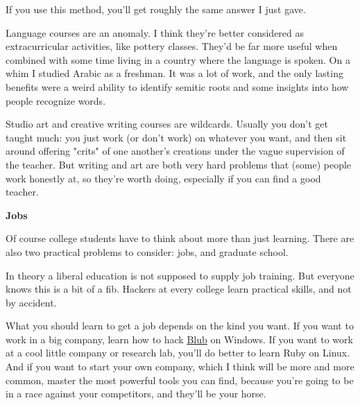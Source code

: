 If you use this method, you'll get
                    roughly the same answer I just gave.

Language
                    courses are an anomaly. I think they're better considered as
                    extracurricular activities, like pottery classes. They'd be
                    far more useful when combined with some time living in a
                    country where the language is spoken. On a whim I studied
                    Arabic as a freshman. It was a lot of work, and the only
                    lasting benefits were a weird ability to identify semitic
                    roots and some insights into how people recognize words.

Studio
                    art and creative writing courses are wildcards. Usually you
                    don't get taught much: you just work (or don't work) on
                    whatever you want, and then sit around offering "crits" of
                    one another's creations under the vague supervision of the
                    teacher. But writing and art are both very hard problems
                    that (some) people work honestly at, so they're worth doing,
                    especially if you can find a good teacher.

\textbf{Jobs}

Of course college students have to think about
                    more than just learning. There are also two practical
                    problems to consider: jobs, and graduate school.

In
                    theory a liberal education is not supposed to supply job
                    training. But everyone knows this is a bit of a fib. Hackers
                    at every college learn practical skills, and not by
                    accident.

What you should learn to get a job
                    depends on the kind you want. If you want to work in a big
                    company, learn how to hack \href{http://www.paulgraham.com/avg.html}{Blub} on
                    Windows. If you want to work at a cool little company or
                    research lab, you'll do better to learn Ruby on Linux. And
                    if you want to start your own company, which I think will be
                    more and more common, master the most powerful tools you can
                    find, because you're going to be in a race against your
                    competitors, and they'll be your horse.

